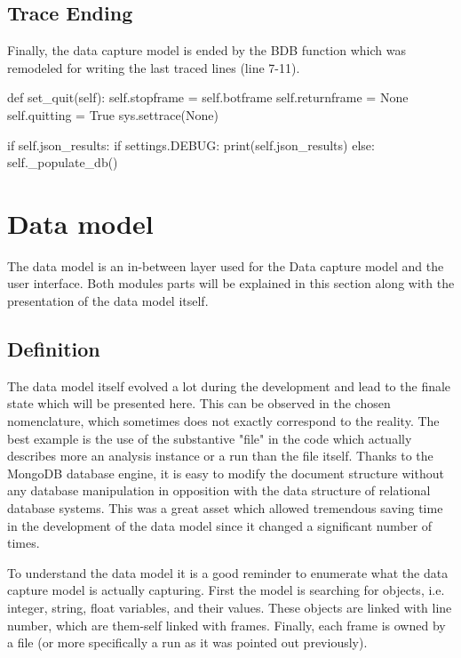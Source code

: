\subsection{Trace Ending}

Finally, the data capture model is ended by the  BDB function which was remodeled for writing the last traced lines (line 7-11).
\begin{python}
def set_quit(self):
    self.stopframe = self.botframe
    self.returnframe = None
    self.quitting = True
    sys.settrace(None)

    if self.json_results:
        if settings.DEBUG:
            print(self.json_results)
        else:
            self._populate_db()
\end{python}



\section{Data model}
The data model is an in-between layer used for the Data capture model and the user interface. Both modules parts will be explained in this section along with the presentation of the data model itself.

\subsection{Definition}
The data model itself evolved a lot during the development and lead to the finale state which will be presented here. This can be observed in the chosen nomenclature, which sometimes does not exactly correspond to the reality. The best example is the use of the substantive "file" in the code which actually describes more an analysis instance or a run than the file itself. Thanks to the MongoDB database engine, it is easy to modify the document structure without any database manipulation in opposition with the data structure of relational database systems. This was a great asset which allowed tremendous saving time in the development of the data model since it changed a significant number of times.

To understand the data model it is a good reminder to enumerate what the data capture model is actually capturing. First the model is searching for objects, i.e. integer, string, float variables, and their values. These objects are linked with line number, which are them-self linked with frames. Finally, each frame is owned by a file (or more specifically a run as it was pointed out previously).

